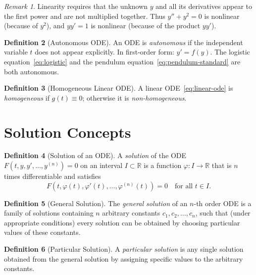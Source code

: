 \documentclass[12pt,a4paper,openany]{book}
\theoremstyle{definition}
\newtheorem{definition}{Definition}[chapter]
\theoremstyle{plain}
\theoremstyle{remark}
\newtheorem{remark}[definition]{Remark}
\newcommand{\R}{\mathbb{R}}
\begin{document}
\begin{remark}
\label{rem:linearity-check}
Linearity requires that the unknown $y$ and all its derivatives appear to the first power and are not multiplied together. Thus $y'' + y^2 = 0$ is nonlinear (because of $y^2$), and $yy' = 1$ is nonlinear (because of the product $yy'$).
\end{remark}

\begin{definition}[Autonomous ODE]
\label{def:autonomous}
An ODE is \emph{autonomous} if the independent variable $t$ does not appear explicitly. In first-order form: $y' = f(y)$. The logistic equation~\eqref{eq:logistic} and the pendulum equation~\eqref{eq:pendulum-standard} are both autonomous.
\end{definition}

\begin{definition}[Homogeneous Linear ODE]
\label{def:homogeneous}
A linear ODE~\eqref{eq:linear-ode} is \emph{homogeneous} if $g(t) \equiv 0$; otherwise it is \emph{non-homogeneous}.
\end{definition}

\section{Solution Concepts}
\label{sec:solution-concepts}

\begin{definition}[Solution of an ODE]
\label{def:solution}
A \emph{solution} of the ODE $F(t,y,y',\ldots,y^{(n)})=0$ on an interval $I\subset\R$ is a function $\varphi\colon I\to\R$ that is $n$ times differentiable and satisfies
\[
  F\!\left(t,\varphi(t),\varphi'(t),\ldots,\varphi^{(n)}(t)\right) = 0
  \quad\text{for all } t\in I.
\]
\end{definition}

\begin{definition}[General Solution]
\label{def:general-solution}
The \emph{general solution} of an $n$-th order ODE is a family of solutions containing $n$ arbitrary constants $c_1, c_2, \ldots, c_n$, such that (under appropriate conditions) every solution can be obtained by choosing particular values of these constants.
\end{definition}

\begin{definition}[Particular Solution]
\label{def:particular-solution}
A \emph{particular solution} is any single solution obtained from the general solution by assigning specific values to the arbitrary constants.
\end{definition}
\end{document}
